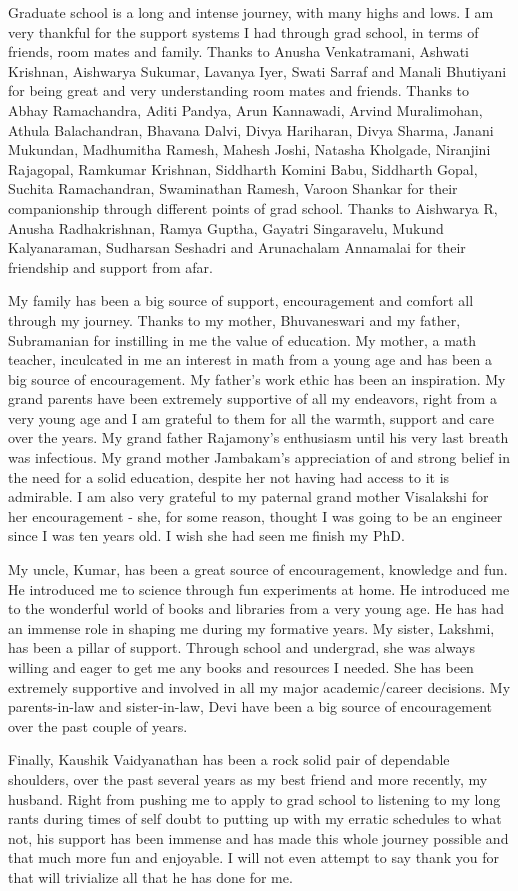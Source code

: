 Graduate school is a long and intense journey, with many highs and
lows. I am very thankful for the support systems I had through
grad school, in terms of friends, room mates and family. Thanks to
Anusha Venkatramani, Ashwati Krishnan, Aishwarya Sukumar, Lavanya
Iyer, Swati Sarraf and Manali Bhutiyani for being great and very
understanding room mates and friends. Thanks to Abhay Ramachandra,
Aditi Pandya, Arun Kannawadi, Arvind Muralimohan, Athula
Balachandran, Bhavana Dalvi, Divya Hariharan, Divya Sharma, Janani
Mukundan, Madhumitha Ramesh, Mahesh Joshi, Natasha Kholgade,
Niranjini Rajagopal, Ramkumar Krishnan, Siddharth Komini Babu,
Siddharth Gopal, Suchita Ramachandran, Swaminathan Ramesh, Varoon
Shankar for their companionship through different points of grad
school. Thanks to Aishwarya R, Anusha Radhakrishnan, Ramya
Guptha, Gayatri Singaravelu, Mukund Kalyanaraman, Sudharsan
Seshadri and Arunachalam Annamalai for their friendship and
support from afar. 

My family has been a big source of support, encouragement and
comfort all through my journey. Thanks to my mother, Bhuvaneswari
and my father, Subramanian for instilling in me the value of
education. My mother, a math teacher, inculcated in me an interest
in math from a young age and has been a big source of
encouragement. My father's work ethic has been an inspiration. My
grand parents have been extremely supportive of all my endeavors,
right from a very young age and I am grateful to them for all the
warmth, support and care over the years. My grand father
Rajamony's enthusiasm until his very last breath was infectious.
My grand mother Jambakam's appreciation of and strong belief in
the need for a solid education, despite her not having had access
to it is admirable. I am also very grateful to my paternal grand
mother Visalakshi for her encouragement - she, for some reason,
thought I was going to be an engineer since I was ten years old. I
wish she had seen me finish my PhD.

My uncle, Kumar, has been a great source of encouragement, knowledge and
fun. He introduced me to science through fun experiments at home.
He introduced me to the wonderful world of books and libraries
from a very young age. He has had an immense role in shaping me
during my formative years. My sister, Lakshmi, has been a pillar of support.
Through school and undergrad, she was always willing and eager to
get me any books and resources I needed. She has been extremely
supportive and involved in all my major academic/career decisions.
My parents-in-law and sister-in-law, Devi have been a big source of
encouragement over the past couple of years.

Finally, Kaushik Vaidyanathan has been a rock solid pair of
dependable shoulders, over the past several years as my best
friend and more recently, my husband. Right from pushing me to
apply to grad school to listening to my long rants during times of
self doubt to putting up with my erratic schedules to what not,
his support has been immense and has made this whole journey
possible and that much more fun and enjoyable. I will not even
attempt to say thank you for that will trivialize all that he has
done for me.
